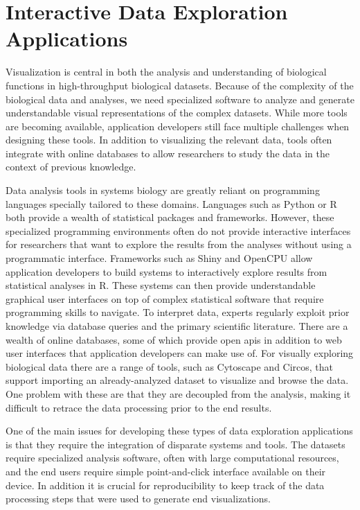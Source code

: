 \chapter{Interactive Data Exploration Applications}\label{interactive}
Visualization is central in both the analysis and understanding of biological
functions in high-throughput biological
datasets.\cite{gehlenborg2010visualization} Because of the complexity of
the biological data and analyses, we need specialized software to analyze and
generate understandable visual representations of the complex datasets.\cite{o2018visualization} 
While more tools are becoming available, application developers still
face multiple challenges when designing these
tools.\cite{o2018visualization,o2010visualizing} In addition to visualizing the
relevant data, tools often integrate with online databases to allow researchers
to study the data in the context of previous
knowledge.\cite{gehlenborg2010visualization,o2018visualization}

Data analysis tools in systems biology are greatly reliant on programming
languages specially tailored to these domains.\cite{fjukstad2017building}
Languages such as Python or R both provide a wealth of statistical packages and
frameworks.  However, these specialized programming environments often do not
provide interactive interfaces for researchers that want to explore the results
from the analyses without using a programmatic interface. Frameworks such as
Shiny\cite{shiny} and OpenCPU\cite{opencpu} allow application developers to
build systems to interactively explore results from statistical analyses in R.
These systems can then provide understandable graphical user interfaces on top
of complex statistical software that require programming skills to navigate.  To
interpret data, experts regularly exploit prior knowledge via database queries
and the primary scientific literature. There are a wealth of online databases,
some of which provide open \glspl{api} in addition to web user interfaces that
application developers can make use of. For visually exploring biological data
there are a range of tools, such as Cytoscape\cite{cytoscape} and
Circos\cite{circos}, that support importing an already-analyzed dataset to
visualize and browse the data. One problem with these are that they are
decoupled from the analysis, making it difficult to retrace the data processing
prior to the end results.  

One of the main issues for developing these types of data exploration
applications is that they require the integration of disparate systems and
tools. The datasets require specialized analysis software, often with large
computational resources, and the end users require simple point-and-click
interface available on their device. In addition it is crucial for
reproducibility to keep track of the data processing steps that were used to
generate end visualizations. 

